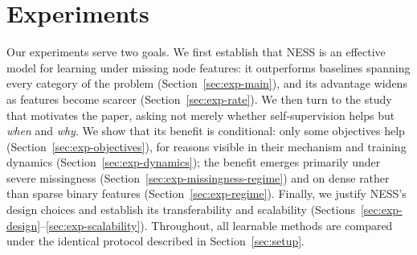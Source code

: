 \section{Experiments}
\label{sec:experiments}

Our experiments serve two goals. We first establish that NESS is an effective model for learning under missing node features: it outperforms baselines spanning every category of the problem (Section~\ref{sec:exp-main}), and its advantage widens as features become scarcer (Section~\ref{sec:exp-rate}). We then turn to the study that motivates the paper, asking not merely whether self-supervision helps but \emph{when} and \emph{why}. We show that its benefit is conditional: only some objectives help (Section~\ref{sec:exp-objectives}), for reasons visible in their mechanism and training dynamics (Section~\ref{sec:exp-dynamics}); the benefit emerges primarily under severe missingness (Section~\ref{sec:exp-missingness-regime}) and on dense rather than sparse binary features (Section~\ref{sec:exp-regime}). Finally, we justify NESS's design choices and establish its transferability and scalability (Sections~\ref{sec:exp-design}--\ref{sec:exp-scalability}). Throughout, all learnable methods are compared under the identical protocol described in Section~\ref{sec:setup}.
